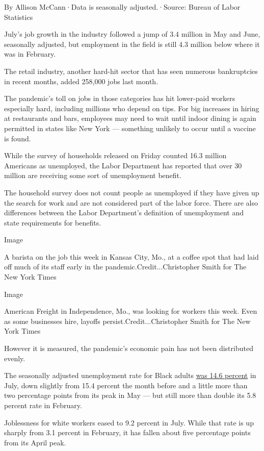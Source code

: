 By Allison McCann·Data is seasonally adjusted.·Source: Bureau of Labor
Statistics

July's job growth in the industry followed a jump of 3.4 million in May
and June, seasonally adjusted, but employment in the field is still 4.3
million below where it was in February.

The retail industry, another hard-hit sector that has seen numerous
bankruptcies in recent months, added 258,000 jobs last month.

The pandemic's toll on jobs in those categories has hit lower-paid
workers especially hard, including millions who depend on tips. For big
increases in hiring at restaurants and bars, employees may need to wait
until indoor dining is again permitted in states like New York ---
something unlikely to occur until a vaccine is found.

While the survey of households released on Friday counted 16.3 million
Americans as unemployed, the Labor Department has reported that over 30
million are receiving some sort of unemployment benefit.

The household survey does not count people as unemployed if they have
given up the search for work and are not considered part of the labor
force. There are also differences between the Labor Department's
definition of unemployment and state requirements for benefits.

Image

A barista on the job this week in Kansas City, Mo., at a coffee spot
that had laid off much of its staff early in the
pandemic.Credit...Christopher Smith for The New York Times

Image

American Freight in Independence, Mo., was looking for workers this
week. Even as some businesses hire, layoffs persist.Credit...Christopher
Smith for The New York Times

However it is measured, the pandemic's economic pain has not been
distributed evenly.

The seasonally adjusted unemployment rate for Black adults
\href{https://www.bls.gov/news.release/empsit.t02.htm}{was 14.6 percent}
in July, down slightly from 15.4 percent the month before and a little
more than two percentage points from its peak in May --- but still more
than double its 5.8 percent rate in February.

Joblessness for white workers eased to 9.2 percent in July. While that
rate is up sharply from 3.1 percent in February, it has fallen about
five percentage points from its April peak.

